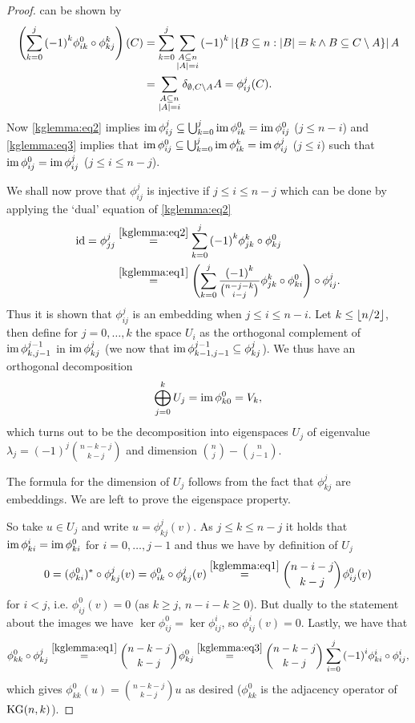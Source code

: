 \begin{proof}
  can be shown by
  \begin{align*}
      \left(\sum_{k=0}^{j}{{(-1)}^k\phi^0_{ik}\circ\phi^k_{kj}}\right)(C)
      & = \sum_{k=0}^{j}\sum_{\substack{A\subseteq n\\ \left|A\right|=i}}{{(-1)}^k\left|\{B\subseteq
              n:\left|B\right|=k\wedge  B\subseteq C\setminus A\}\right|A}\\
      & = \sum_{\substack{A\subseteq n\\ \left|A\right|=i}}{\delta_{\emptyset,C\setminus A}A} = \phi^j_{ij}(C)\text{.}
  \end{align*}
  Now \autoref{kglemma:eq2}
  implies $\mathop\mathrm{im}\phi_{ij}^j\subseteq\bigcup_{k=0}^j{\mathop\mathrm{im}\phi_{ik}^0}=\mathop\mathrm{im}\phi_{ij}^0$ ($j\leq n-i$) and \autoref{kglemma:eq3}
  implies that $\mathop\mathrm{im}\phi_{ij}^0\subseteq\bigcup_{k=0}^j{\mathop\mathrm{im}\phi_{ik}^k}=\mathop\mathrm{im}\phi_{ij}^j$ ($j\leq i$) such that $\mathop\mathrm{im}\phi_{ij}^0=\mathop\mathrm{im}\phi_{ij}^j$ ($j\leq i\leq n-j$).
  
  We shall now prove that $\phi^j_{ij}$ is injective if $j\leq i\leq n-j$ which can be done by applying the `dual' equation of \autoref{kglemma:eq2}
  \begin{align*}
      \id=\phi^j_{jj}
      & \stackrel{\autoref{kglemma:eq2}}{=}
      \sum_{k=0}^{j}{{(-1)}^k\phi^k_{jk}\compose\phi^0_{kj}}\\
      & \stackrel{\autoref{kglemma:eq1}}{=} \left(\sum_{k=0}^{j}{\frac{{(-1)}^k}{\binom{n-j-k}{i-j}}\phi^k_{jk}\compose\phi^0_{ki}}\right)\compose\phi^j_{ij}\text{.}
  \end{align*}
  Thus it is shown that $\phi^j_{ij}$ is an embedding when $j\leq i\leq n-i$. Let $k\leq \left\lfloor n/2\right\rfloor$, then define for $j=0,\ldots,k$ the space $U_i$ as the orthogonal complement of $\mathop\mathrm{im}\phi_{k,j-1}^{j-1}$ in $\mathop\mathrm{im}\phi_{kj}^j$ (we now that $\mathop\mathrm{im}\phi_{k-1,j-1}^{j-1}\subseteq\phi_{kj}^j$). We thus have an orthogonal decomposition
  $$
  \bigoplus_{j=0}^k{U_j}=\mathop\mathrm{im}\phi_{k0}^0=V_k,
  $$
  which turns out to be the decomposition into eigenspaces $U_j$ of eigenvalue $\lambda_j={(-1)}^j\binom{n-k-j}{k-j}$ and dimension $\binom{n}{j}-\binom{n}{j-1}$.

  The formula for the dimension of $U_j$ follows from the fact that $\phi_{kj}^j$ are embeddings. We are left to prove the eigenspace property.

  So take $u\in U_j$ and write $u=\phi_{kj}^j(v)$. As $j\leq k\leq n-j$ it holds that $\mathop\mathrm{im}\phi_{ki}^i=\mathop\mathrm{im}\phi_{ki}^0$ for $i=0,\ldots,j-1$ and thus we have by definition of $U_j$
  $$
  0=\dual{(\phi_{ki}^0)}\compose\phi_{kj}^j(v)=\phi_{ik}^0\compose\phi_{kj}^j(v)\stackrel{\autoref{kglemma:eq1}}{=}\binom{n-i-j}{k-j}\phi_{ij}^0(v)
  $$
  for $i<j$, i.e. $\phi_{ij}^0(v)=0$ (as $k\geq j$, $n-i-k\geq 0$). But dually to the statement about the images we have $\ker\phi_{ij}^0=\ker\phi_{ij}^i$, so $\phi_{ij}^i(v)=0$.
  Lastly, we have that
  $$
  \phi_{kk}^0\compose\phi_{kj}^j\stackrel{\autoref{kglemma:eq1}}{=}\binom{n-k-j}{k-j}\phi_{kj}^0\stackrel{\autoref{kglemma:eq3}}{=}\binom{n-k-j}{k-j}\sum_{i=0}^j{{(-1)}^i\phi_{ki}^i\compose\phi_{ij}^i},
  $$
  which gives $\phi_{kk}^0(u)=\binom{n-k-j}{k-j}u$ as desired ($\phi_{kk}^0$ is the adjacency operator of $\mathop\mathrm{KG}(n,k)$).
\end{proof}


